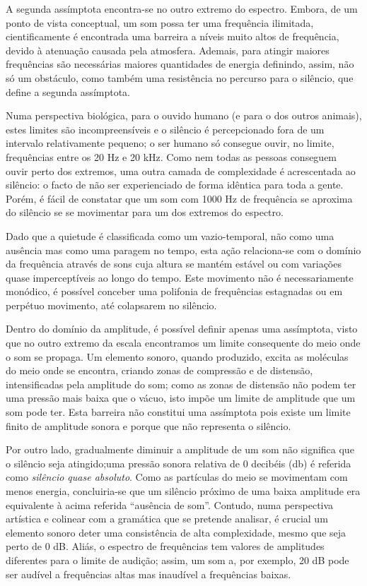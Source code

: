 \documentclass[../main.tex]{subfiles}
\begin{document}
A segunda assímptota encontra-se no outro extremo do espectro. Embora, de um ponto de vista conceptual, um som possa ter uma frequência ilimitada, cientificamente é encontrada uma barreira a níveis muito altos de frequência, devido à atenuação causada pela atmosfera\cite{ejakov,evans,benade}. Ademais, para atingir maiores frequências são necessárias maiores quantidades de energia definindo, assim, não só um obstáculo, como também uma resistência no percurso para o silêncio, que define a segunda assímptota.

Numa perspectiva biológica, para o ouvido humano (e para o dos outros animais), estes limites são incompreensíveis e o silêncio é percepcionado fora de um intervalo relativamente pequeno; o ser humano só consegue ouvir, no limite, frequências entre os 20 Hz e 20 kHz\cite{olson}. Como nem todas as pessoas conseguem ouvir perto dos extremos, uma outra camada de complexidade é acrescentada ao silêncio: o facto de não ser experienciado de forma idêntica para toda a gente. Porém, é fácil de constatar que um som com 1000 Hz de frequência se aproxima do silêncio se se movimentar para um dos extremos do espectro.

Dado que a quietude é classificada como um vazio-temporal, não como uma ausência mas como uma paragem no tempo, esta ação relaciona-se com o domínio da frequência através de sons cuja altura se mantém estável ou com variações quase imperceptíveis ao longo do tempo. Este movimento não é necessariamente monódico, é possível conceber uma polifonia de frequências estagnadas ou em perpétuo movimento, até colapsarem no silêncio.


Dentro do domínio da amplitude, é possível definir apenas uma assímptota, visto que no outro extremo da escala encontramos um limite consequente do meio onde o som se propaga. Um elemento sonoro, quando produzido, excita as moléculas do meio onde se encontra, criando zonas de compressão e de distensão, intensificadas pela amplitude do som; como as zonas de distensão não podem ter uma pressão mais baixa que o vácuo, isto impõe um limite de amplitude que um som pode ter\cite{self2020small}. Esta barreira não constitui uma assímptota pois existe um limite finito de amplitude sonora e porque que não representa o silêncio.

Por outro lado, gradualmente diminuir a amplitude de um som não significa que o silêncio seja atingido;uma pressão sonora relativa de 0 decibéis (db) é referida como \textsl{silêncio quase absoluto}. Como as partículas do meio se movimentam com menos energia, concluiria-se que um silêncio próximo de uma baixa amplitude era equivalente à acima referida \enquote{ausência de som}. Contudo, numa perspectiva artística e colinear com a gramática que se pretende analisar, é crucial um elemento sonoro deter uma consistência de alta complexidade, mesmo que seja perto de 0 dB. Aliás, o espectro de frequências tem valores de amplitudes diferentes para o limite de audição; assim, um som a, por exemplo, 20 dB pode ser audível a frequências altas mas inaudível a frequências baixas\cite{benade}.
\end{document}
